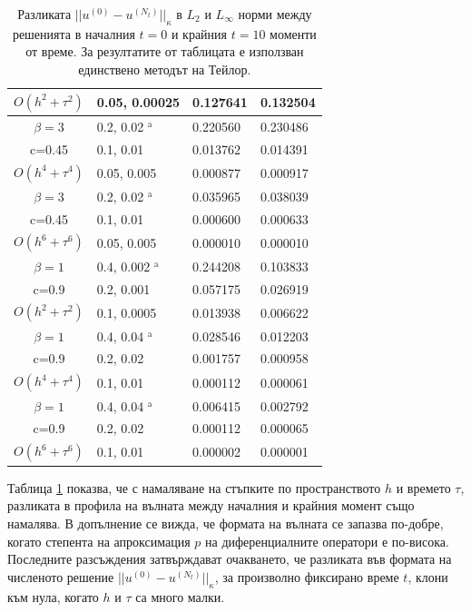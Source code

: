 \documentclass[a4paper]{article}
\theoremstyle{remark}
\begin{document}
\begin{large}
\begin{table}[ht]
\begin{tabular}{||c|l|l|l||}
     $O(h^2 + \tau^ 2)$ &0.05, 0.00025   & 0.127641 & 0.132504      \\
			\hline 
  $\beta=3$               &0.2, 0.02 $^{\text{a}}$      &0.220560 & 0.230486       \\
   c=0.45                    &0.1, 0.01      &0.013762 & 0.014391        \\
     $O(h^4+ \tau^4)$ &0.05, 0.005&0.000877 & 0.000917         \\
			\hline 
  $\beta=3$               &0.2, 0.02 $^{\text{a}}$       &  0.035965 & 0.038039        \\
     c=0.45                 &0.1, 0.01        &0.000600 & 0.000633       \\
     $O(h^6+ \tau^6)$ &0.05, 0.005 &0.000010 & 0.000010          \\
	   \hline
			\hline 
       $\beta=1$       &0.4, 0.002 $^{\text{a}}$       & 0.244208 & 0.103833 \\
                  c=0.9    &0.2, 0.001       &  0.057175 & 0.026919  \\
  $O(h^2+ \tau^2)$ &0.1, 0.0005   & 0.013938 & 0.006622  \\
			\hline
      $\beta=1$               &0.4, 0.04 $^{\text{a}}$    &0.028546 & 0.012203 \\
       c=0.9                     &0.2, 0.02     & 0.001757 & 0.000958     \\
       $O(h^4+ \tau^4)$ &0.1, 0.01   & 0.000112 & 0.000061   \\
    \hline
  $\beta=1$                  &0.4, 0.04 $^{\text{a}}$   &0.006415 & 0.002792  \\
      c=0.9                    &0.2, 0.02   &0.000112 & 0.000065     \\
     $O(h^6+ \tau^6)$ &0.1, 0.01 & 0.000002 & 0.000001         \\
	   \hline
			\hline 
		\end{tabular}
		\caption{Разликата $||u^{(0)} - u^{(N_t)}||_\kappa$ в $L_2$ и $L_\infty$ норми между решенията в началния $t=0$ и крайния $t=10$ моменти от време. За резултатите от таблицата е използван единствено методът на Тейлор.}
\label{tableG}
\end{table}
\FloatBarrier
Таблица \ref{tableG} показва, че с намаляване на стъпките по пространството $h$ и времето $\tau$, разликата в профила на вълната между началния и крайния момент също намалява. В допълнение се вижда, че формата на вълната се запазва по-добре, когато степента на апроксимация $p$ на диференциалните оператори е по-висока. Последните разсъждения затвърждават очакването, че разликата във формата на численото решение $||u^{(0)} - u^{(N_t)}||_\kappa$, за произволно фиксирано време $t$, клони към нула, когато $h$ и $\tau$ са много малки.


\end{large}
\end{document}
